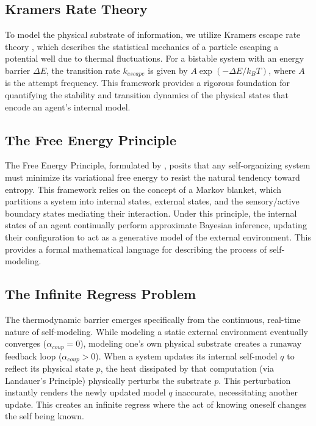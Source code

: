 \documentclass[12pt]{article}
\begin{document}
\subsection{Kramers Rate Theory}
To model the physical substrate of information, we utilize Kramers escape rate theory \citep{kramers1940}, which describes the statistical mechanics of a particle escaping a potential well due to thermal fluctuations. For a bistable system with an energy barrier $\Delta E$, the transition rate $k_{escape}$ is given by $A \exp(-\Delta E / k_B T)$, where $A$ is the attempt frequency. This framework provides a rigorous foundation for quantifying the stability and transition dynamics of the physical states that encode an agent's internal model.

\subsection{The Free Energy Principle}
The Free Energy Principle, formulated by \citet{friston2010}, posits that any self-organizing system must minimize its variational free energy to resist the natural tendency toward entropy. This framework relies on the concept of a Markov blanket, which partitions a system into internal states, external states, and the sensory/active boundary states mediating their interaction. Under this principle, the internal states of an agent continually perform approximate Bayesian inference, updating their configuration to act as a generative model of the external environment. This provides a formal mathematical language for describing the process of self-modeling.

\subsection{The Infinite Regress Problem}
The thermodynamic barrier emerges specifically from the continuous, real-time nature of self-modeling. While modeling a static external environment eventually converges ($\alpha_{coup} = 0$), modeling one's own physical substrate creates a runaway feedback loop ($\alpha_{coup} > 0$). When a system updates its internal self-model $q$ to reflect its physical state $p$, the heat dissipated by that computation (via Landauer's Principle) physically perturbs the substrate $p$. This perturbation instantly renders the newly updated model $q$ inaccurate, necessitating another update. This creates an infinite regress where the act of knowing oneself changes the self being known.
\end{document}
